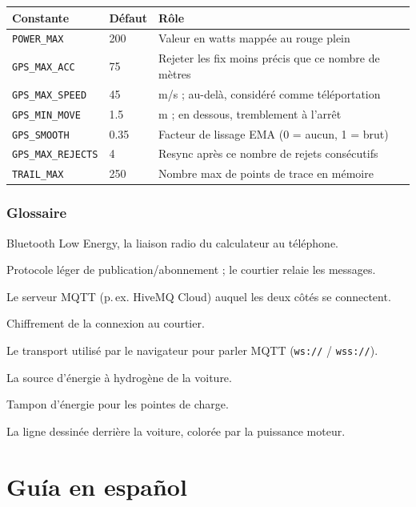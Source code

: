 \documentclass[11pt,a4paper,oneside]{report}
\newcommand{\code}[1]{\texttt{#1}}
\newcommand{\guidepart}[1]{%
  \clearpage
  \part*{#1}%
  \addcontentsline{toc}{part}{#1}%
  \setcounter{section}{0}%
}
\begin{document}
\begin{tabularx}{\linewidth}{@{}llL@{}}
\toprule
\textbf{Constante} & \textbf{Défaut} & \textbf{Rôle}\\
\midrule
\code{POWER\_MAX} & 200 & Valeur en watts mappée au rouge plein\\
\code{GPS\_MAX\_ACC} & 75 & Rejeter les fix moins précis que ce nombre de mètres\\
\code{GPS\_MAX\_SPEED} & 45 & m/s ; au-delà, considéré comme téléportation\\
\code{GPS\_MIN\_MOVE} & 1.5 & m ; en dessous, tremblement à l'arrêt\\
\code{GPS\_SMOOTH} & 0.35 & Facteur de lissage EMA (0 = aucun, 1 = brut)\\
\code{GPS\_MAX\_REJECTS} & 4 & Resync après ce nombre de rejets consécutifs\\
\code{TRAIL\_MAX} & 250 & Nombre max de points de trace en mémoire\\
\bottomrule
\end{tabularx}

\section{Glossaire}
\begin{description}[style=nextline,leftmargin=0pt,labelwidth=0pt,labelsep=0pt,itemindent=0pt]
  \item[BLE] Bluetooth Low Energy, la liaison radio du calculateur au téléphone.
  \item[MQTT] Protocole léger de publication/abonnement ; le courtier relaie les messages.
  \item[Courtier (broker)] Le serveur MQTT (p.\,ex. HiveMQ Cloud) auquel les deux côtés se connectent.
  \item[TLS] Chiffrement de la connexion au courtier.
  \item[WebSocket] Le transport utilisé par le navigateur pour parler MQTT (\code{ws://} / \code{wss://}).
  \item[Pile à combustible (FC)] La source d'énergie à hydrogène de la voiture.
  \item[Supercondensateur] Tampon d'énergie pour les pointes de charge.
  \item[Trace] La ligne dessinée derrière la voiture, colorée par la puissance moteur.
\end{description}


\guidepart{Guía en español}
\end{document}
